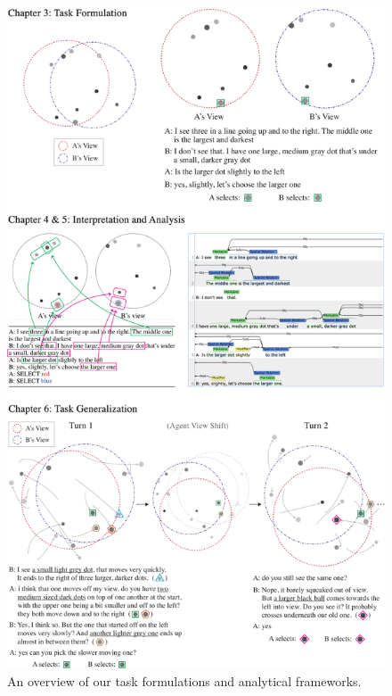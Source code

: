\begin{figure}[t!]
\centering
\includegraphics[width=\textwidth]{contribution_overview.pdf}
\caption{An overview of our task formulations and analytical frameworks.}
\label{01_fig:contribution_overview}
\end{figure}

